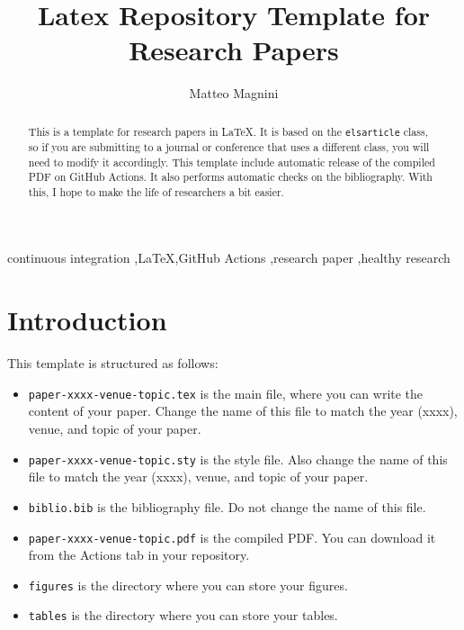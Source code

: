 \documentclass[final,5pt,times,twocolumn]{elsarticle}
\begin{document}
    \begin{frontmatter}
        \title{Latex Repository Template for Research Papers}

        \author[disi]{Matteo Magnini}


        \begin{abstract}
            This is a template for research papers in \LaTeX.
            It is based on the \texttt{elsarticle} class, so if you are submitting to a journal or conference that uses a different class, you will need to modify it accordingly.
            This template include automatic release of the compiled PDF on GitHub Actions.
            It also performs automatic checks on the bibliography.
            With this, I hope to make the life of researchers a bit easier.
        \end{abstract}

        \begin{keyword}
            continuous integration \sep \LaTeX \sep GitHub Actions \sep research paper \sep healthy research
        \end{keyword}

    \end{frontmatter}

    \section{Introduction}\label{sec:introduction}
        This template is structured as follows:
        \begin{itemize}
            \item[] \texttt{paper-xxxx-venue-topic.tex} is the main file, where you can write the content of your paper.
            Change the name of this file to match the year (xxxx), venue, and topic of your paper.
            \item[] \texttt{paper-xxxx-venue-topic.sty} is the style file.
            Also change the name of this file to match the year (xxxx), venue, and topic of your paper.
            \item[] \texttt{biblio.bib} is the bibliography file.
            Do not change the name of this file.
            \item[] \texttt{paper-xxxx-venue-topic.pdf} is the compiled PDF.
            You can download it from the Actions tab in your repository.
            \item[] \texttt{figures} is the directory where you can store your figures.
            \item[] \texttt{tables} is the directory where you can store your tables.
        \end{itemize}
\end{document}
